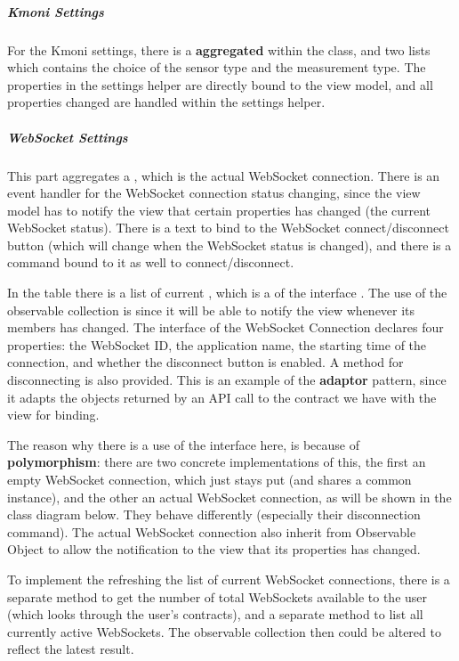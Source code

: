\subparagraph{Kmoni Settings}

For the Kmoni settings, there is a  \textbf{aggregated} within the class, and two lists which contains the choice of the sensor type and the measurement type. The properties in the settings helper are directly bound to the view model, and all properties changed are handled within the settings helper.

\subparagraph{WebSocket Settings}

This part aggregates a , which is the actual WebSocket connection. There is an event handler for the WebSocket connection status changing, since the view model has to notify the view that certain properties has changed (the current WebSocket status). There is a text to bind to the WebSocket connect/disconnect button (which will change when the WebSocket status is changed), and there is a command bound to it as well to connect/disconnect.

In the table there is a list of current , which is a  of the interface . The use of the observable collection is since it will be able to notify the view whenever its members has changed. The interface of the WebSocket Connection declares four properties: the WebSocket ID, the application name, the starting time of the connection, and whether the disconnect button is enabled. A method for disconnecting is also provided. This is an example of the \textbf{adaptor} pattern, since it adapts the objects returned by an API call to the contract we have with the view for binding.

The reason why there is a use of the interface here, is because of \textbf{polymorphism}: there are two concrete implementations of this, the first an empty WebSocket connection, which just stays put (and shares a common instance), and the other an actual WebSocket connection, as will be shown in the class diagram below. They behave differently (especially their disconnection command). The actual WebSocket connection also inherit from Observable Object to allow the notification to the view that its properties has changed.

To implement the refreshing the list of current WebSocket connections, there is a separate method to get the number of total WebSockets available to the user (which looks through the user's contracts), and a separate method to list all currently active WebSockets. The observable collection then could be altered to reflect the latest result.

